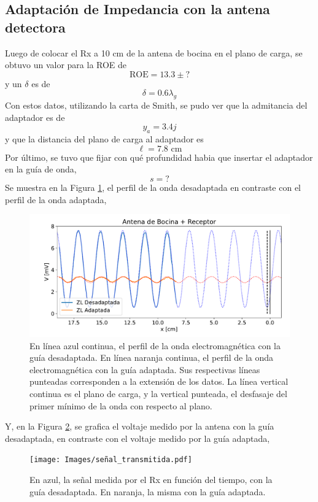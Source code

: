 \documentclass[11pt,a4paper]{article}
\begin{document}
\begin{multicols}{2}
\subsection{Adaptación de Impedancia con la antena detectora}
Luego de colocar el Rx a 10 cm de la antena de bocina en el plano de carga, se obtuvo un valor para la ROE de
$$
\text{ROE} = 13.3\pm?
$$
y un $\delta$ es de
$$
\delta = 0.6\lambda_g
$$
Con estos datos, utilizando la carta de Smith, se pudo ver que la admitancia del adaptador es de
$$
y_a = 3.4j
$$
y que la distancia del plano de carga al adaptador es
$$
\ell = 7.8 \text{ cm}
$$
Por último, se tuvo que fijar con qué profundidad habia que insertar el adaptador en la guía de onda,
$$
s = ?
$$
Se muestra en la Figura \ref{fig:bocirec}, el perfil de la onda desadaptada en contraste con el perfil de la onda adaptada,
\begin{figure}[H]
    \centering
    \includegraphics[width=\linewidth]{Images/bocina_receptor.pdf}
    \caption{En línea azul continua, el perfil de la onda electromagnética con la guía desadaptada. En línea naranja continua, el perfil de la onda electromagnética con la guía adaptada. Sus respectivas líneas punteadas corresponden a la extensión de los datos. La línea vertical continua es el plano de carga, y la vertical punteada, el desfasaje del primer mínimo de la onda con respecto al plano.}
    \label{fig:bocirec}
\end{figure}
Y, en la Figura \ref{fig:senal}, se grafica el voltaje medido por la antena con la guía desadaptada, en contraste con el voltaje medido por la guía adaptada,
\begin{figure}[H]
    \centering
    \texttt{[image: Images/señal\_transmitida.pdf]}
    \caption{En azul, la señal medida por el Rx en función del tiempo, con la guía desadaptada. En naranja, la misma con la guía adaptada.}
    \label{fig:senal}
\end{figure}

\end{multicols}
\end{document}
